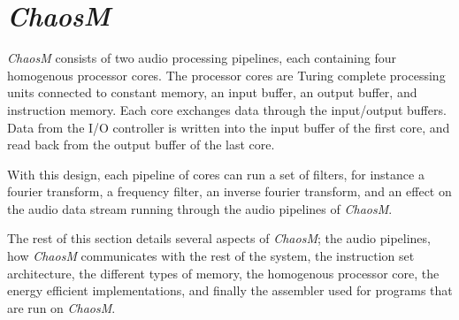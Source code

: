 \FloatBarrier
\section{\textit{ChaosM}}\label{chapter:fpga}

\textit{ChaosM} consists of two audio processing pipelines, each containing four
homogenous processor cores. The processor cores are Turing complete processing
units connected to constant memory, an input buffer, an output buffer, and
instruction memory. Each core exchanges data through the input/output buffers.
Data from the I/O controller is written into the input buffer of the first core,
and read back from the output buffer of the last core.

With this design, each pipeline of cores can run a set of filters, for instance
a fourier transform, a frequency filter, an inverse fourier transform, and an
effect on the audio data stream running through the audio pipelines of
\textit{ChaosM}.

The rest of this section details several aspects of \textit{ChaosM}; the audio
pipelines, how \textit{ChaosM} communicates with the rest of the system, the
instruction set architecture, the different types of memory, the homogenous
processor core, the energy efficient implementations, and finally the assembler
used for programs that are run on \textit{ChaosM}.








